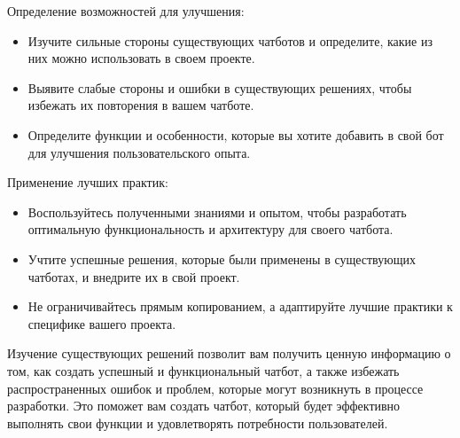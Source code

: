 \documentclass[letterpaper,10pt,russian]{sphinxmanual}
\begin{document}
 Определение возможностей для улучшения:
\begin{itemize}
\item {} 
\sphinxAtStartPar
Изучите сильные стороны существующих чат\sphinxhyphen{}ботов и определите, какие из них можно использовать в своем проекте.

\item {} 
\sphinxAtStartPar
Выявите слабые стороны и ошибки в существующих решениях, чтобы избежать их повторения в вашем чат\sphinxhyphen{}боте.

\item {} 
\sphinxAtStartPar
Определите функции и особенности, которые вы хотите добавить в свой бот для улучшения пользовательского опыта.

\end{itemize}

 Применение лучших практик:
\begin{itemize}
\item {} 
\sphinxAtStartPar
Воспользуйтесь полученными знаниями и опытом, чтобы разработать оптимальную функциональность и архитектуру для своего чат\sphinxhyphen{}бота.

\item {} 
\sphinxAtStartPar
Учтите успешные решения, которые были применены в существующих чат\sphinxhyphen{}ботах, и внедрите их в свой проект.

\item {} 
\sphinxAtStartPar
Не ограничивайтесь прямым копированием, а адаптируйте лучшие практики к специфике вашего проекта.

\end{itemize}

\sphinxAtStartPar
Изучение существующих решений позволит вам получить ценную информацию о том, как создать успешный и функциональный чат\sphinxhyphen{}бот, а также избежать распространенных ошибок и проблем, которые могут возникнуть в процессе разработки. Это поможет вам создать чат\sphinxhyphen{}бот, который будет эффективно выполнять свои функции и удовлетворять потребности пользователей.
\end{document}
